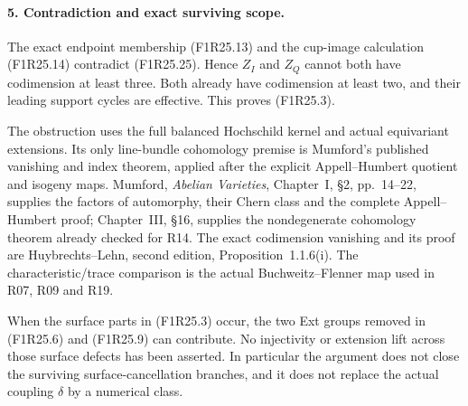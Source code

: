\paragraph{5. Contradiction and exact surviving scope.}
The exact endpoint membership (F1R25.13) and
the cup-image calculation (F1R25.14) contradict
(F1R25.25). Hence $Z_I$ and $Z_Q$ cannot both
have codimension at least three.
Both already have codimension at least two,
and their leading support cycles are effective.
This proves (F1R25.3).

The obstruction uses the full balanced
Hochschild kernel and actual equivariant
extensions. Its only line-bundle cohomology
premise is Mumford's published vanishing and
index theorem, applied after the explicit
Appell--Humbert quotient and isogeny maps.
Mumford, \emph{Abelian Varieties}, Chapter~I,
\S2, pp.~14--22, supplies the factors of
automorphy, their Chern class and the complete
Appell--Humbert proof; Chapter~III, \S16,
supplies the nondegenerate cohomology theorem
already checked for R14. The exact codimension
vanishing and its proof are
Huybrechts--Lehn, second edition,
Proposition~1.1.6(i). The characteristic/trace
comparison is the actual Buchweitz--Flenner
map used in R07, R09 and R19.

When the surface parts in (F1R25.3) occur,
the two Ext groups removed in (F1R25.6) and
(F1R25.9) can contribute. No injectivity
or extension lift across those surface defects
has been asserted. In particular the argument
does not close the surviving surface-cancellation
branches, and it does not replace the actual
coupling $\delta$ by a numerical class.
